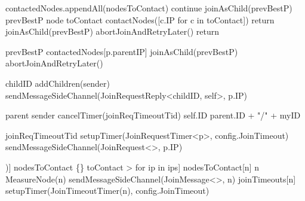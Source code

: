 \begin{algorithm}{}
\begin{algorithmic}[1]
 \label{alg:memb:join:cond_go}
    \State contactedNodes.appendAll(nodesToContact)
         \label{alg:memb:join:verif_children}
            \State continue 
        \EndIf
         \label{alg:memb:join:verif_vs_prev}
            \State joinAsChild(prevBestP)
        \Else
            \State prevBestP \asdassign node \label{alg:memb:join:advance}
            \State toContact 
            \State contactNodes([c.IP for c in toContact])
        \EndIf
        \State return
    \EndFor
    {joinAsChild(prevBestP)}  \label{alg:memb:join:join_base_case}
    {abortJoinAndRetryLater()} 
    \State return
\asdend

 \label{alg:memb:join:exclusions}
\asdend

            \State prevBestP \asdassign contactedNodes[p.parentIP]
            \State joinAsChild(prevBestP)
        \Else
            \State abortJoinAndRetryLater()
        \EndIf
    \EndIf
\asdend

    \State childID \asdassign addChildren(sender) 
    \State sendMessageSideChannel(JoinRequestReply<childID, self>, p.IP)
\asdend
    
        \State parent \asdassign sender 
        \State cancelTimer(joinReqTimeoutTid)
        \State self.ID \asdassign parent.ID + "/" + myID 
    \EndIf
\asdend

    \State joinReqTimeoutTid \asdassign setupTimer(JoinRequestTimer<p>, config.JoinTimeout)
    \State sendMessageSideChannel(JoinRequest<>, p.IP)
\asdend

\asdprocedure[contactNodes(ips : IP[])]
    \State nodesToContact \asdassign \{\}
    \State toContact \asdassign [Node<0,nil,0,false,lIP,false,[]> for ip in ips]
        \State nodesToContact[n] \asdassign n
        \State MeasureNode(n) 
        \State sendMessageSideChannel(JoinMessage<>, n)
        \State joinTimeouts[n] \asdassign \asdassign setupTimer(JoinTimeoutTimer(n), config.JoinTimeout)
    \EndFor
\asdend

\end{algorithmic}
\end{algorithm}
